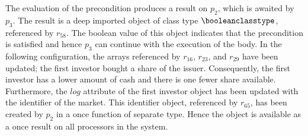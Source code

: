 \begin{fortechnicalreport}
\begin{example}
The evaluation of the precondition produces a result on $p_{2}$, which is awaited by $p_{3}$. The result is a deep imported object of class type $\booleanclasstype$, referenced by $r_{58}$. The boolean value of this object indicates that the precondition is satisfied and hence $p_{3}$ can continue with the execution of the body. In the following configuration, the arrays referenced by $r_{16}$, $r_{23}$, and $r_{29}$ have been updated; the first investor bought a share of the issuer. Consequently, the first investor has a lower amount of cash and there is one fewer share available. Furthermore, the $log$ attribute of the first investor object has been updated with the identifier of the market. This identifier object, referenced by $r_{65}$, has been created by $p_{2}$ in a once function of separate type. Hence the object is available as a once result on all processors in the system.


\end{example}
\end{fortechnicalreport}
